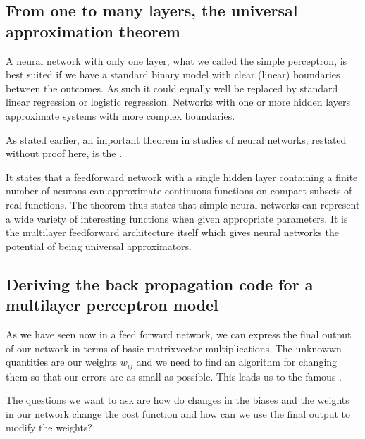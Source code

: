\documentclass[letterpaper,10pt,english]{sphinxmanual}
\begin{document}
\subsection{From one to many layers, the universal approximation theorem}
\label{\detokenize{chapter6:from-one-to-many-layers-the-universal-approximation-theorem}}
A neural network with only one layer, what we called the simple
perceptron, is best suited if we have a standard binary model with
clear (linear) boundaries between the outcomes. As such it could
equally well be replaced by standard linear regression or logistic
regression. Networks with one or more hidden layers approximate
systems with more complex boundaries.

As stated earlier,
an important theorem in studies of neural networks, restated without
proof here, is the .

It states that a feed\sphinxhyphen{}forward network with a single hidden layer
containing a finite number of neurons can approximate continuous
functions on compact subsets of real functions. The theorem thus
states that simple neural networks can represent a wide variety of
interesting functions when given appropriate parameters. It is the
multilayer feedforward architecture itself which gives neural networks
the potential of being universal approximators.


\subsection{Deriving the back propagation code for a multilayer perceptron model}
\label{\detokenize{chapter6:deriving-the-back-propagation-code-for-a-multilayer-perceptron-model}}

As we have seen now in a feed forward network, we can express the final output of our network in terms of basic matrix\sphinxhyphen{}vector multiplications.
The unknowwn quantities are our weights \(w_{ij}\) and we need to find an algorithm for changing them so that our errors are as small as possible.
This leads us to the famous .

The questions we want to ask are how do changes in the biases and the
weights in our network change the cost function and how can we use the
final output to modify the weights?
\end{document}
